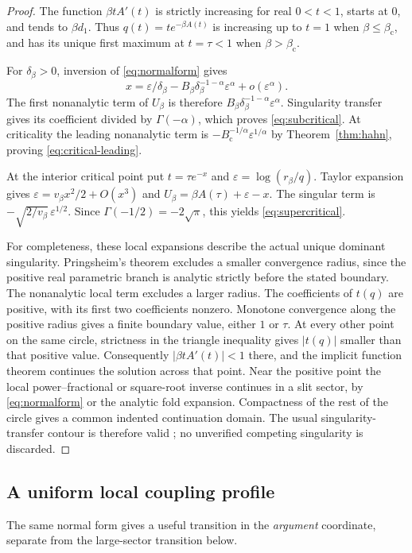\documentclass[11pt,a4paper]{article}
\numberwithin{equation}{section}
\theoremstyle{definition}
\theoremstyle{remark}
\newcommand{\bc}{\beta_{\mathrm c}}
\newcommand{\Bc}{B_{\mathrm c}}
\begin{document}
\begin{proof}
The function $\beta tA'(t)$ is strictly increasing for real $0<t<1$,
starts at $0$, and tends to $\beta d_1$. Thus $q(t)=t e^{-\beta A(t)}$
is increasing up to $t=1$ when $\beta\le\bc$, and has its unique first
maximum at $t=\tau<1$ when $\beta>\bc$.

For $\delta_\beta>0$, inversion of \eqref{eq:normalform} gives
\[
 x=\varepsilon/\delta_\beta
   -B_\beta\delta_\beta^{-1-\alpha}\varepsilon^\alpha
   +o(\varepsilon^\alpha).
\]
The first nonanalytic term of $U_\beta$ is therefore
$B_\beta\delta_\beta^{-1-\alpha}\varepsilon^\alpha$.
Singularity transfer gives its coefficient divided by $\Gamma(-\alpha)$,
which proves \eqref{eq:subcritical}. At criticality the leading
nonanalytic term is $-\Bc^{-1/\alpha}\varepsilon^{1/\alpha}$ by
Theorem~\ref{thm:hahn}, proving \eqref{eq:critical-leading}.

At the interior critical point put $t=\tau e^{-x}$ and
$\varepsilon=\log(r_\beta/q)$. Taylor expansion gives
$\varepsilon=v_\beta x^2/2+O(x^3)$ and
$U_\beta=\beta A(\tau)+\varepsilon-x$.
The singular term is $-\sqrt{2/v_\beta}\,\varepsilon^{1/2}$.
Since $\Gamma(-1/2)=-2\sqrt\pi$, this yields
\eqref{eq:supercritical}.

For completeness, these local expansions describe the actual unique
dominant singularity. Pringsheim's theorem excludes a smaller convergence
radius, since the positive real parametric branch is analytic strictly
before the stated boundary. The nonanalytic local term excludes a larger
radius. The coefficients of $t(q)$ are positive, with its
first two coefficients nonzero. Monotone convergence along the positive
radius gives a finite boundary value, either $1$ or $\tau$. At every
other point on the same circle, strictness in the triangle inequality
gives $|t(q)|$ smaller than that positive value. Consequently
$|\beta t A'(t)|<1$ there, and the implicit function theorem continues
the solution across that point. Near the positive point the local
power--fractional or square-root inverse continues in a slit sector,
by \eqref{eq:normalform} or the analytic fold expansion. Compactness of
the rest of the circle gives a common indented continuation domain.
The usual singularity-transfer contour is therefore valid
\cite[Ch.~VI]{flajolet}; no unverified competing singularity is discarded.
\end{proof}

\subsection{A uniform local coupling profile}
The same normal form gives a useful transition in the \emph{argument}
coordinate, separate from the large-sector transition below.
\end{document}
